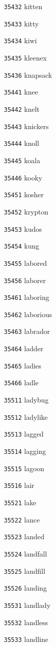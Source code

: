 \documentclass[twoside,11pt]{article}
\begin{document}
\begin{multicols}{5}
\begin{enumerate}
\item[\texttt{35432}] kitten
\item[\texttt{35433}] kitty
\item[\texttt{35434}] kiwi
\item[\texttt{35435}] kleenex
\item[\texttt{35436}] knapsack
\item[\texttt{35441}] knee
\item[\texttt{35442}] knelt
\item[\texttt{35443}] knickers
\item[\texttt{35444}] knoll
\item[\texttt{35445}] koala
\item[\texttt{35446}] kooky
\item[\texttt{35451}] kosher
\item[\texttt{35452}] krypton
\item[\texttt{35453}] kudos
\item[\texttt{35454}] kung
\item[\texttt{35455}] labored
\item[\texttt{35456}] laborer
\item[\texttt{35461}] laboring
\item[\texttt{35462}] laborious
\item[\texttt{35463}] labrador
\item[\texttt{35464}] ladder
\item[\texttt{35465}] ladies
\item[\texttt{35466}] ladle
\item[\texttt{35511}] ladybug
\item[\texttt{35512}] ladylike
\item[\texttt{35513}] lagged
\item[\texttt{35514}] lagging
\item[\texttt{35515}] lagoon
\item[\texttt{35516}] lair
\item[\texttt{35521}] lake
\item[\texttt{35522}] lance
\item[\texttt{35523}] landed
\item[\texttt{35524}] landfall
\item[\texttt{35525}] landfill
\item[\texttt{35526}] landing
\item[\texttt{35531}] landlady
\item[\texttt{35532}] landless
\item[\texttt{35533}] landline

\end{enumerate}
\end{multicols}
\end{document}
